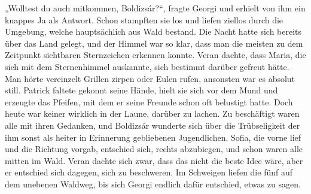 \documentclass[oneside]{memoir}
\begin{document}
„Wolltest du auch mitkommen, Boldizsár?“, fragte Georgi und erhielt von ihm ein knappes Ja als Antwort. Schon stampften sie los und liefen ziellos durch die Umgebung, welche hauptsächlich aus Wald bestand. Die Nacht hatte sich bereits über das Land gelegt, und der Himmel war so klar, dass man die meisten zu dem Zeitpunkt sichtbaren Sternzeichen erkennen konnte. Veran dachte, dass Maria, die sich mit dem Sternenhimmel auskannte, sich bestimmt darüber gefreut hätte. Man hörte vereinzelt Grillen zirpen oder Eulen rufen, ansonsten war es absolut still. Patrick faltete gekonnt seine Hände, hielt sie sich vor dem Mund und erzeugte das Pfeifen, mit dem er seine Freunde schon oft belustigt hatte. Doch heute war keiner wirklich in der Laune, darüber zu lachen. Zu beschäftigt waren alle mit ihren Gedanken, und Boldizsár wunderte sich über die Trübseligkeit der ihm sonst als heiter in Erinnerung gebliebenen Jugendlichen. Sofia, die vorne lief und die Richtung vorgab, entschied sich, rechts abzubiegen, und schon waren alle mitten im Wald. Veran dachte sich zwar, dass das nicht die beste Idee wäre, aber er entschied sich dagegen, sich zu beschweren. Im Schweigen liefen die fünf auf dem unebenen Waldweg, bis sich Georgi endlich dafür entschied, etwas zu sagen. \\
\end{document}
